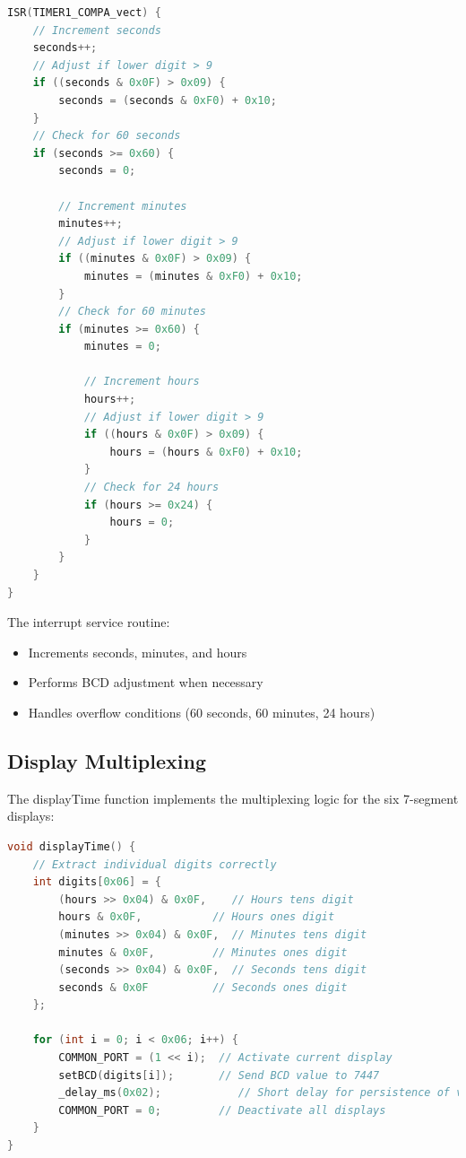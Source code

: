 \documentclass[12pt]{article}
\begin{document}
\begin{lstlisting}[language=C, caption=Timer Interrupt Service Routine]
ISR(TIMER1_COMPA_vect) {
    // Increment seconds
    seconds++;
    // Adjust if lower digit > 9
    if ((seconds & 0x0F) > 0x09) {
        seconds = (seconds & 0xF0) + 0x10;
    }
    // Check for 60 seconds
    if (seconds >= 0x60) {
        seconds = 0;
        
        // Increment minutes
        minutes++;
        // Adjust if lower digit > 9
        if ((minutes & 0x0F) > 0x09) {
            minutes = (minutes & 0xF0) + 0x10;
        }
        // Check for 60 minutes
        if (minutes >= 0x60) {
            minutes = 0;
            
            // Increment hours
            hours++;
            // Adjust if lower digit > 9
            if ((hours & 0x0F) > 0x09) {
                hours = (hours & 0xF0) + 0x10;
            }
            // Check for 24 hours
            if (hours >= 0x24) {
                hours = 0;
            }
        }
    }
}
\end{lstlisting}

The interrupt service routine:
\begin{itemize}
    \item Increments seconds, minutes, and hours
    \item Performs BCD adjustment when necessary
    \item Handles overflow conditions (60 seconds, 60 minutes, 24 hours)
\end{itemize}

\subsection{Display Multiplexing}

The displayTime function implements the multiplexing logic for the six 7-segment displays:

\begin{lstlisting}[language=C, caption=Display Multiplexing Function]
void displayTime() {
    // Extract individual digits correctly
    int digits[0x06] = {
        (hours >> 0x04) & 0x0F,    // Hours tens digit
        hours & 0x0F,           // Hours ones digit
        (minutes >> 0x04) & 0x0F,  // Minutes tens digit
        minutes & 0x0F,         // Minutes ones digit
        (seconds >> 0x04) & 0x0F,  // Seconds tens digit
        seconds & 0x0F          // Seconds ones digit
    };

    for (int i = 0; i < 0x06; i++) {
        COMMON_PORT = (1 << i);  // Activate current display
        setBCD(digits[i]);       // Send BCD value to 7447
        _delay_ms(0x02);            // Short delay for persistence of vision
        COMMON_PORT = 0;         // Deactivate all displays
    }
}
\end{lstlisting}
\end{document}
